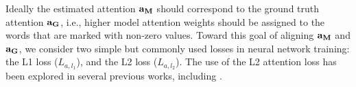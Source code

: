 \documentclass[letterpaper]{article} %
\begin{document}
Ideally the estimated attention $\bf{a}_{M}$ should correspond to the ground truth attention $\bf{a}_{G}$, i.e., higher model attention weights should be assigned to the words that are marked with non-zero values. Toward this goal of aligning $\bf{a}_{M}$ and  $\bf{a}_{G}$, we consider two simple but commonly used losses in neural network training: the L1 loss ($L_{a,l_1}$), and the L2 loss ($L_{a,l_2}$). The use of the L2 attention loss has been  explored in several previous works, including \cite{liu2016neural,liu2017exploiting}.

\begin{table}[htbp!]
\captionsetup{font=normalsize}
\centering
{}
\caption{Abusive language detection performance. C:  using only comment labels, and C+S:  using comment and sentence labels. }
\label{tab:detection_performance}
\end{table}
\end{document}
